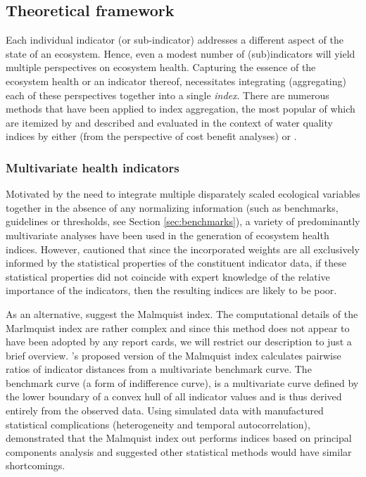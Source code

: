 \subsection{Theoretical framework}
 
Each individual indicator (or sub-indicator) addresses a different aspect of the state of an
ecosystem.  Hence, even a modest number of (sub)indicators will yield multiple perspectives on
ecosystem health.  Capturing the essence of the ecosystem health or an indicator thereof,
necessitates integrating (aggregating) each of these perspectives together into a single
\textit{index}.  There are numerous methods that have been applied to index aggregation, the most
popular of which are itemized by \citet{Fox-2013-2013} and described and evaluated in the context of
water quality indices by either \citet{Walsh-2012} (from the perspective of cost benefit analyses)
or \citet{Whittaker-2012}.

\subsubsection{Multivariate health indicators}

Motivated by the need to integrate multiple disparately scaled ecological variables together in the
absence of any normalizing information (such as benchmarks, guidelines or thresholds, see Section
\ref{sec:benchmarks}), a variety of predominantly multivariate analyses have been used in the
generation of ecosystem health indices.  However, \citet{Whittaker-2012} cautioned that since the
incorporated weights are all exclusively informed by the statistical properties of the constituent
indicator data, if these statistical properties did not coincide with expert knowledge of the
relative importance of the indicators, then the resulting indices are likely to be poor.

As an alternative, \citet{Whittaker-2012} suggest the Malmquist index.  The computational details of
the Marlmquist index are rather complex and since this method does not appear to have been adopted
by any report cards, we will restrict our description to just a brief overview.
\citet{Whittaker-2012}'s proposed version of the Malmquist index calculates pairwise ratios of
indicator distances from a multivariate benchmark curve.  The benchmark curve (a form of
indifference curve), is a multivariate curve defined by the lower boundary of a convex hull of all
indicator values and is thus derived entirely from the observed data.  Using simulated data with
manufactured statistical complications (heterogeneity and temporal autocorrelation),
\citet{Whittaker-2012} demonstrated that the Malmquist index out performs indices based on principal
components analysis and suggested other statistical methods would have similar shortcomings.

